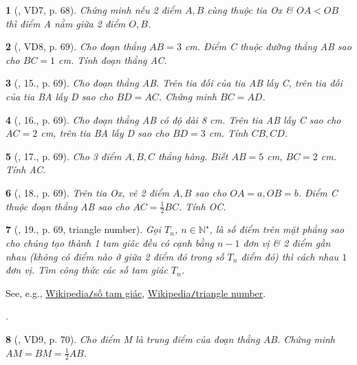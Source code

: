 \documentclass{article}
\newtheorem{baitoan}{}
\begin{document}
\begin{baitoan}[\cite{Binh_Toan_6_tap_2}, VD7, p. 68]
	Chứng minh nếu 2 điểm $A,B$ cùng thuộc tia Ox \& $OA < OB$ thì điểm A nằm giữa 2 điểm $O,B$.
\end{baitoan}

\begin{baitoan}[\cite{Binh_Toan_6_tap_2}, VD8, p. 69]
	Cho đoạn thẳng $AB = 3$ {\rm cm}. Điểm C thuộc đường thẳng AB sao cho $BC = 1$ {\rm cm}. Tính  đoạn thẳng AC.
\end{baitoan}

\begin{baitoan}[\cite{Binh_Toan_6_tap_2}, 15., p. 69]
	Cho đoạn thẳng AB. Trên tia đối của tia AB lấy C, trên tia đối của tia BA lấy D sao cho $BD = AC$. Chứng minh $BC = AD$.
\end{baitoan}

\begin{baitoan}[\cite{Binh_Toan_6_tap_2}, 16., p. 69]
	Cho đoạn thẳng AB có độ dài {\rm8 cm}. Trên tia AB lấy C sao cho $AC = 2$ {\rm cm}, trên tia BA lấy D sao cho $BD = 3$ {\rm cm}. Tính  $CB,CD$.
\end{baitoan}

\begin{baitoan}[\cite{Binh_Toan_6_tap_2}, 17., p. 69]
	Cho 3 điểm $A,B,C$ thẳng hàng. Biết $AB = 5$ {\rm cm}, $BC = 2$ {\rm cm}. Tính  AC.
\end{baitoan}

\begin{baitoan}[\cite{Binh_Toan_6_tap_2}, 18., p. 69]
	Trên tia Ox, vẽ 2 điểm $A,B$ sao cho $OA = a,OB = b$. Điểm C thuộc đoạn thẳng AB sao cho $AC = \frac{1}{2}BC$. Tính  OC.
\end{baitoan}

\begin{baitoan}[\cite{Binh_Toan_6_tap_2}, 19., p. 69, triangle number]
	Gọi $T_n$, $n\in\mathbb{N}^\star$, là số điểm trên mặt phẳng sao cho chúng tạo thành 1 tam giác đều có cạnh bằng $n - 1$ đơn vị \& 2 điểm gần nhau (không có điểm nào ở giữa 2 điểm đó trong số $T_n$ điểm đó) thì cách nhau $1$ đơn vị. Tìm công thức các số tam giác $T_n$.
\end{baitoan}
See, e.g., \href{https://vi.wikipedia.org/wiki/S%E1%BB%91_tam_gi%C3%A1c}{Wikipedia{\tt/}số tam giác}, \href{https://en.wikipedia.org/wiki/Triangular_number}{Wikipedia{\tt/}triangle number}.

\cite[20., p. 70]{Binh_Toan_6_tap_2}.

\begin{baitoan}[\cite{Binh_Toan_6_tap_2}, VD9, p. 70]
	Cho điểm M là trung điểm của đoạn thẳng AB. Chứng minh $AM = BM = \frac{1}{2}AB$.
\end{baitoan}
\end{document}
